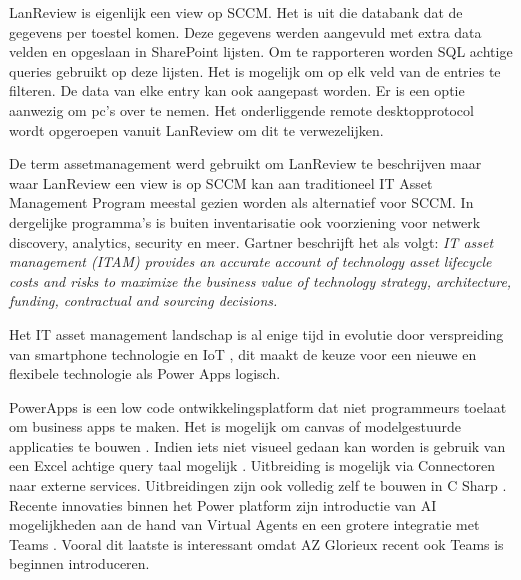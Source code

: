 
LanReview is eigenlijk een view op SCCM. Het is uit die databank dat de gegevens per toestel komen. Deze gegevens werden aangevuld met extra data velden en opgeslaan in SharePoint lijsten. Om te rapporteren worden SQL achtige queries gebruikt op deze lijsten. Het is mogelijk om op elk veld van de entries te filteren. De data van elke entry kan ook aangepast worden. Er is een optie aanwezig om pc's over te nemen. Het onderliggende remote desktopprotocol wordt opgeroepen vanuit LanReview om dit te verwezelijken.

De term assetmanagement werd gebruikt om LanReview te beschrijven maar waar LanReview een view is op SCCM kan aan traditioneel IT Asset Management Program meestal gezien worden als alternatief voor SCCM. In dergelijke programma's is buiten inventarisatie ook voorziening voor netwerk discovery, analytics, security en meer. Gartner \parencite{Gartner2020} beschrijft het als volgt: \emph{IT asset management (ITAM) provides an accurate account of technology asset lifecycle costs and risks to maximize the business value of technology strategy, architecture, funding, contractual and sourcing decisions.}

Het IT asset management landschap is al enige tijd in evolutie door verspreiding van smartphone technologie en  IoT \parencite{Badnakhe2020}, dit maakt de keuze voor een nieuwe en flexibele technologie als Power Apps logisch.

PowerApps is een low code ontwikkelingsplatform dat niet programmeurs toelaat om business apps te maken. Het is mogelijk om canvas of modelgestuurde applicaties te bouwen \parencite{Knight2019}. Indien iets niet visueel gedaan kan worden is gebruik van een Excel achtige query taal mogelijk \parencite{Owen2019}. Uitbreiding is mogelijk via Connectoren naar externe services. Uitbreidingen zijn ook volledig zelf te bouwen in C Sharp \parencite{Vivek2019}.
Recente innovaties binnen het Power platform zijn introductie van AI mogelijkheden aan de hand van Virtual Agents en een grotere integratie met Teams \parencite{Cunningham2019}. Vooral dit laatste is interessant omdat AZ Glorieux recent ook Teams is beginnen introduceren.

